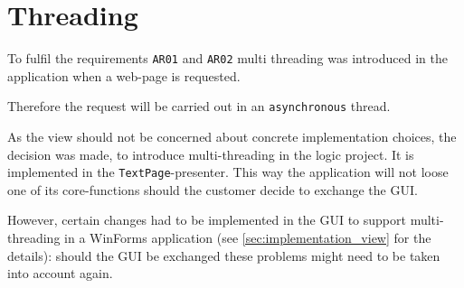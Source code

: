 \section{Threading}
\label{subsec:threading}

To fulfil the requirements \texttt{AR01} and \texttt{AR02} multi threading was introduced in the application when a web-page is requested.

Therefore the request will be carried out in an \texttt{asynchronous} thread.

As the view should not be concerned about concrete implementation choices, the decision was made, to introduce multi-threading in the \ac{logic} project. It is implemented in the \texttt{TextPage}-presenter. This way the application will not loose one of its core-functions should the customer decide to exchange the \ac{GUI}.

However, certain changes had to be implemented in the \ac{GUI} to support multi-threading in a WinForms application (see \autoref{sec:implementation_view} for the details): should the \ac{GUI} be exchanged these problems might need to be taken into account again.